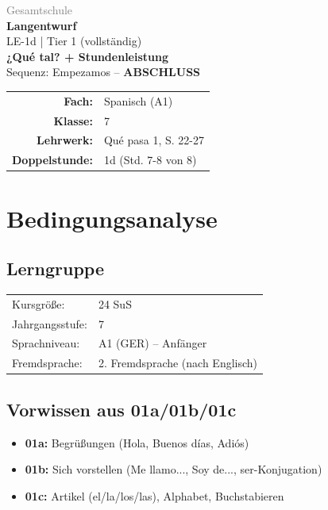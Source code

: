 \documentclass[11pt,a4paper]{article}
\newcommand{\fach}{Spanisch}
\newcommand{\jahrgangsstufe}{7}
\newcommand{\schulart}{Gesamtschule}
\newcommand{\stundenthema}{¿Qué tal? + Stundenleistung}
\newcommand{\reihenthema}{Empezamos}
\newcommand{\stundennummer}{1d}
\newcommand{\lehrwerk}{Qué pasa 1}
\newcommand{\lehrwerkseite}{S. 22-27}
\newcommand{\lerngruppengroesse}{24}
\begin{document}
\begin{titlepage}
    \centering
    \vspace*{2cm}
    {\large\textcolor{gray}{\schulart}}\\[2cm]
    {\Huge\textcolor{fach}{\textbf{Langentwurf}}}\\[0.5cm]
    {\large LE-\stundennummer{} | Tier 1 (vollständig)}\\[2cm]
    {\LARGE\textbf{\stundenthema}}\\[0.5cm]
    {\large Sequenz: \reihenthema{} -- \textbf{ABSCHLUSS}}\\[2cm]
    \begin{tabular}{rl}
        \textbf{Fach:} & \fach{} (A1) \\[0.3cm]
        \textbf{Klasse:} & \jahrgangsstufe \\[0.3cm]
        \textbf{Lehrwerk:} & \lehrwerk, \lehrwerkseite \\[0.3cm]
        \textbf{Doppelstunde:} & \stundennummer{} (Std. 7-8 von 8) \\[0.3cm]
    \end{tabular}
    \vfill
\end{titlepage}

\tableofcontents
\newpage

\section{Bedingungsanalyse}

\subsection{Lerngruppe}
\begin{tabular}{ll}
    Kursgröße: & \lerngruppengroesse{} SuS \\
    Jahrgangsstufe: & \jahrgangsstufe \\
    Sprachniveau: & A1 (GER) -- Anfänger \\
    Fremdsprache: & 2. Fremdsprache (nach Englisch) \\
\end{tabular}

\subsection{Vorwissen aus 01a/01b/01c}
\begin{itemize}
    \item \textbf{01a:} Begrüßungen (Hola, Buenos días, Adiós)
    \item \textbf{01b:} Sich vorstellen (Me llamo..., Soy de..., ser-Konjugation)
    \item \textbf{01c:} Artikel (el/la/los/las), Alphabet, Buchstabieren
\end{itemize}
\end{document}
